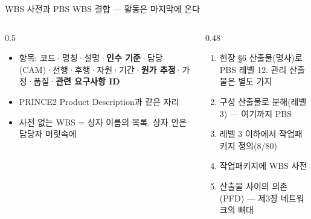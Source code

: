 \begin{frame}{WBS 사전과 PBS \ra{} WBS 결합 — 활동은 마지막에 온다}
\begin{columns}[T]
\begin{column}{0.5\textwidth}
\begin{itemize}
\item 항목: 코드·명칭·설명·\textbf{인수 기준}·담당(CAM)·선행·후행·자원·기간·\textbf{원가 추정}·가정·품질·\textbf{관련 요구사항 ID}
\item PRINCE2 Product Description과 같은 자리
\item 사전 없는 WBS = 상자 이름의 목록. 상자 안은 담당자 머릿속에
\end{itemize}
\end{column}
\begin{column}{0.48\textwidth}
\begin{enumerate}
\item 헌장 §6 산출물(명사)로 PBS 레벨 1\til{}2. 관리 산출물은 별도 가지
\item 구성 산출물로 분해(레벨 3) — 여기까지 PBS
\item 레벨 3 이하에서 작업패키지 정의(8/80)
\item 작업패키지에 WBS 사전
\item 산출물 사이의 의존(PFD) — 제3장 네트워크의 뼈대
\end{enumerate}
\end{column}
\end{columns}
\end{frame}

